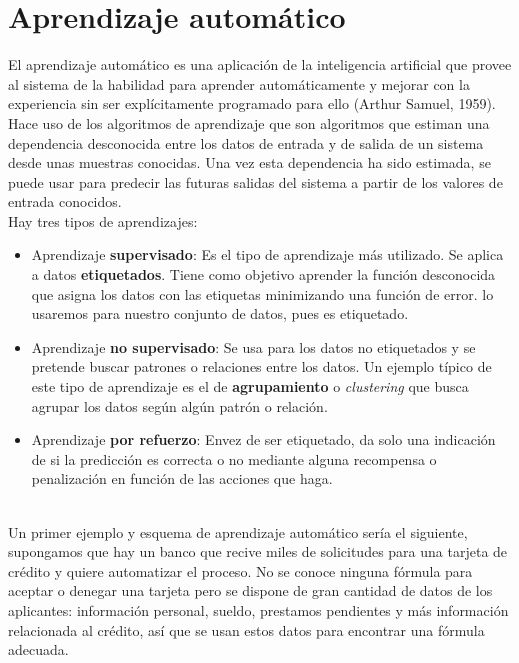 
\chapter{Aprendizaje automático}\label{ch:machine-learning}
El aprendizaje automático es una aplicación de la inteligencia artificial que provee al sistema de la habilidad para aprender automáticamente y mejorar con la experiencia sin ser explícitamente programado para ello (Arthur Samuel, 1959). Hace uso de los algoritmos de aprendizaje que son algoritmos que estiman una dependencia desconocida entre los datos de entrada y de salida de un sistema desde unas muestras conocidas. Una vez esta dependencia ha sido estimada, se puede usar para predecir las futuras salidas del sistema a partir de los valores de entrada conocidos.\\
Hay tres tipos de aprendizajes:
\begin{itemize}
  \item Aprendizaje \textbf{supervisado}: Es el tipo de aprendizaje más utilizado. Se aplica a datos \textbf{etiquetados}. Tiene como objetivo aprender la función desconocida que asigna los datos con las etiquetas minimizando una función de error. lo usaremos para nuestro conjunto de datos, pues es etiquetado.
  \item Aprendizaje \textbf{no supervisado}: Se usa para los datos no etiquetados y se pretende buscar patrones o relaciones entre los datos. Un ejemplo típico de este tipo de aprendizaje es el de \textbf{agrupamiento} o \textit{clustering} que busca agrupar los datos según algún patrón o relación.
  \item Aprendizaje \textbf{por refuerzo}: Envez de ser etiquetado, da solo una indicación de si la predicción es correcta o no mediante alguna recompensa o penalización en función de las acciones que haga.
\end{itemize}
\cite{jordan2015machine}\\
Un primer ejemplo y esquema de aprendizaje automático sería el siguiente, supongamos que hay un banco que recive miles de solicitudes para una tarjeta de crédito y quiere automatizar el proceso. No se conoce ninguna fórmula para aceptar o denegar una tarjeta pero se dispone de gran cantidad de datos de los aplicantes: información personal, sueldo, prestamos pendientes y más información relacionada al crédito, así que se usan estos datos para encontrar una fórmula adecuada.\\
